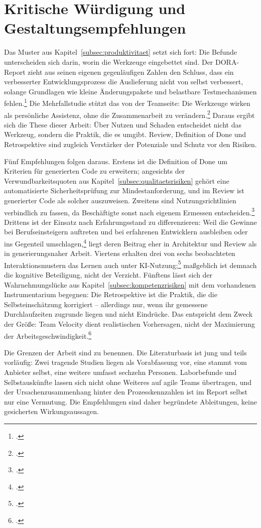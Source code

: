 \section{Kritische Würdigung und Gestaltungsempfehlungen}\label{sec:wuerdigung}
Das Muster aus Kapitel~\ref{subsec:produktivitaet} setzt sich fort: Die Befunde unterscheiden sich darin, worin die Werkzeuge eingebettet sind. Der DORA-Report zieht aus seinen eigenen gegenläufigen Zahlen den Schluss, dass ein verbesserter Entwicklungsprozess die Auslieferung nicht von selbst verbessert, solange Grundlagen wie kleine Änderungspakete und belastbare Testmechanismen fehlen.\footcite[\vglf][]{DORA.2024} Die Mehrfallstudie stützt das von der Teamseite: Die Werkzeuge wirken als persönliche Assistenz, ohne die Zusammenarbeit zu verändern.\footcite[\vglf][]{Neumann.2026} Daraus ergibt sich die These dieser Arbeit: Über Nutzen und Schaden entscheidet nicht das Werkzeug, sondern die Praktik, die es umgibt. Review, Definition of Done und Retrospektive sind zugleich Verstärker der Potenziale und Schutz vor den Risiken.

Fünf Empfehlungen folgen daraus. Erstens ist die Definition of Done um Kriterien für generierten Code zu erweitern; angesichts der Verwundbarkeitsquoten aus Kapitel~\ref{subsec:qualitaetsrisiken} gehört eine automatisierte Sicherheitsprüfung zur Mindestanforderung, und im Review ist generierter Code als solcher auszuweisen. Zweitens sind Nutzungsrichtlinien verbindlich zu fassen, da Beschäftigte sonst nach eigenem Ermessen entscheiden.\footcite[\vglf][]{Neumann.2026} Drittens ist der Einsatz nach Erfahrungsstand zu differenzieren: Weil die Gewinne bei Berufseinsteigern auftreten und bei erfahrenen Entwicklern ausbleiben oder ins Gegenteil umschlagen,\footcites(\vglf)()[][]{Gambacorta.2024}[][]{Becker.2025} liegt deren Beitrag eher in Architektur und Review als in generierungsnaher Arbeit. Viertens erhalten drei von sechs beobachteten Interaktionsmustern das Lernen auch unter KI-Nutzung;\footcite[\vglf][]{Shen.2026} maßgeblich ist demnach die kognitive Beteiligung, nicht der Verzicht. Fünftens lässt sich der Wahrnehmungslücke aus Kapitel~\ref{subsec:kompetenzrisiken} mit dem vorhandenen Instrumentarium begegnen: Die Retrospektive ist die Praktik, die die Selbsteinschätzung korrigiert -- allerdings nur, wenn ihr gemessene Durchlaufzeiten zugrunde liegen und nicht Eindrücke. Das entspricht dem Zweck der Größe: Team Velocity dient realistischen Vorhersagen, nicht der Maximierung der Arbeitsgeschwindigkeit.\footcite[\vglf][]{Preussig.2020}

Die Grenzen der Arbeit sind zu benennen. Die Literaturbasis ist jung und teils vorläufig: Zwei tragende Studien liegen als Vorabfassung vor, eine stammt vom Anbieter selbst, eine weitere umfasst sechzehn Personen. Laborbefunde und Selbstauskünfte lassen sich nicht ohne Weiteres auf agile Teams übertragen, und der Ursachenzusammenhang hinter den Prozesskennzahlen ist im Report selbst nur eine Vermutung. Die Empfehlungen sind daher begründete Ableitungen, keine gesicherten Wirkungsaussagen.
